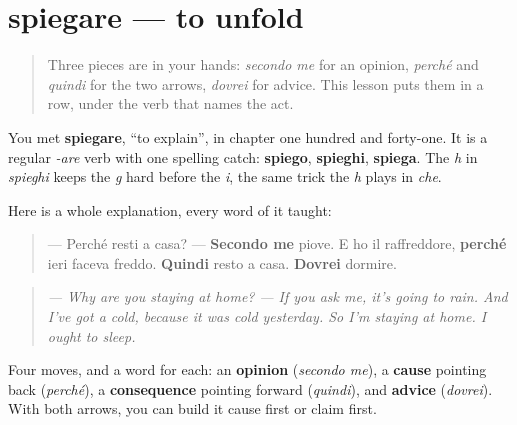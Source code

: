 \section[spiegare]{spiegare — to unfold}

\label{lesson:IT-C266-spiegare}



\begin{quote}
Three pieces are in your hands: \emph{secondo me} for an opinion, \emph{perché} and \emph{quindi} for the two arrows, \emph{dovrei} for advice. This lesson puts them in a row, under the verb that names the act.
\end{quote}

\begin{grammarlens}[title={Grammar Lens: the shape of an explanation}]
You met \textbf{spiegare}, \textquotedblleft{}to explain\textquotedblright{}, in chapter one hundred and forty-one. It is a regular \emph{-are} verb with one spelling catch: \textbf{spiego}, \textbf{spieghi}, \textbf{spiega}. The \emph{h} in \emph{spieghi} keeps the \emph{g} hard before the \emph{i}, the same trick the \emph{h} plays in \emph{che}.

Here is a whole explanation, every word of it taught:

\begin{quote}
— Perché resti a casa? — \textbf{Secondo me} piove. E ho il raffreddore, \textbf{perché} ieri faceva freddo. \textbf{Quindi} resto a casa. \textbf{Dovrei} dormire.
\end{quote}

\begin{quote}
\emph{— Why are you staying at home?} \emph{— If you ask me, it's going to rain. And I've got a cold, because it was cold yesterday. So I'm staying at home. I ought to sleep.}
\end{quote}

Four moves, and a word for each: an \textbf{opinion} (\emph{secondo me}), a \textbf{cause} pointing back (\emph{perché}), a \textbf{consequence} pointing forward (\emph{quindi}), and \textbf{advice} (\emph{dovrei}). With both arrows, you can build it cause first or claim first.
\end{grammarlens}

